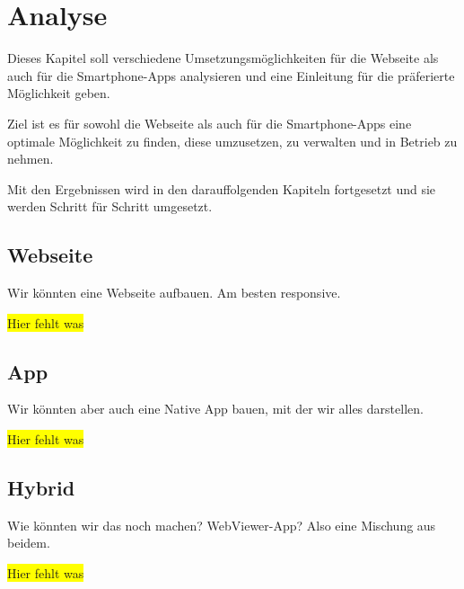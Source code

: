 \section{Analyse}
Dieses Kapitel soll verschiedene Umsetzungsmöglichkeiten für die Webseite als auch für die Smartphone-Apps analysieren
und eine Einleitung für die präferierte Möglichkeit geben.

Ziel ist es für sowohl die Webseite als auch für die Smartphone-Apps eine optimale Möglichkeit zu finden, diese
umzusetzen, zu verwalten und in Betrieb zu nehmen.

Mit den Ergebnissen wird in den darauffolgenden Kapiteln fortgesetzt und sie werden Schritt für Schritt umgesetzt.

\subsection{Webseite}
Wir könnten eine Webseite aufbauen. Am besten responsive.

\colorbox{yellow}{Hier fehlt was}

\subsection{App}
Wir könnten aber auch eine Native App bauen, mit der wir alles darstellen.

\colorbox{yellow}{Hier fehlt was}

\subsection{Hybrid}
Wie könnten wir das noch machen? WebViewer-App? Also eine Mischung aus beidem.

\colorbox{yellow}{Hier fehlt was}